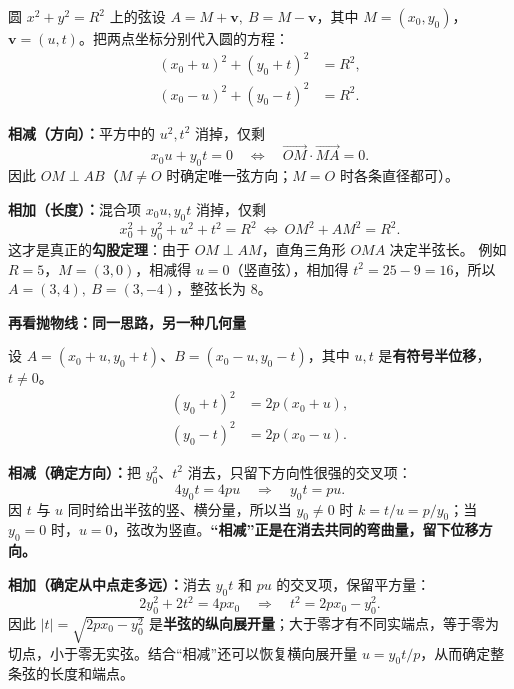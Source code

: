 \begin{explanationbox}
圆 $x^2+y^2=R^2$ 上的弦设 $A=M+\mathbf v,\ B=M-\mathbf v$，其中
$M=(x_0,y_0)$，$\mathbf v=(u,t)$。把两点坐标分别代入圆的方程：
\[
\begin{aligned}
 (x_0+u)^2+(y_0+t)^2&=R^2,\\
 (x_0-u)^2+(y_0-t)^2&=R^2.
\end{aligned}
\]
\par\noindent\textbf{相减（方向）：}平方中的 $u^2,t^2$ 消掉，仅剩
\[
\boxed{x_0u+y_0t=0}
\quad\Longleftrightarrow\quad
\overrightarrow{OM}\cdot\overrightarrow{MA}=0.
\]
因此 $OM\perp AB$（$M\ne O$ 时确定唯一弦方向；$M=O$ 时各条直径都可）。
\par\noindent\textbf{相加（长度）：}混合项 $x_0u,y_0t$ 消掉，仅剩
\[
\boxed{x_0^2+y_0^2+u^2+t^2=R^2}
\ \Longleftrightarrow\ \boxed{OM^2+AM^2=R^2}.
\]
这才是真正的\textbf{勾股定理}：由于 $OM\perp AM$，直角三角形 $OMA$ 决定半弦长。
例如 $R=5$，$M=(3,0)$，相减得 $u=0$（竖直弦），相加得 $t^2=25-9=16$，所以 $A=(3,4),\ B=(3,-4)$，整弦长为 $8$。
\par\medskip
\begin{minipage}{\linewidth}
\noindent
\textbf{\textcolor{CExplanation}{再看抛物线：同一思路，另一种几何量}}\par\nobreak\smallskip
\par
\begin{minipage}{\linewidth}
\begin{center}
\resizebox{0.82\linewidth}{!}{}
\end{center}
\end{minipage}\par
\end{minipage}
\par

\par

设 $A=(x_0+u,y_0+t)$、$B=(x_0-u,y_0-t)$，其中 $u,t$ 是\textbf{有符号半位移}，$t\ne0$。
\[
\begin{aligned}
 (y_0+t)^2&=2p(x_0+u),\\
 (y_0-t)^2&=2p(x_0-u).
\end{aligned}
\]
\par\noindent\textbf{相减（确定方向）：}把 $y_0^2$、$t^2$ 消去，只留下方向性很强的交叉项：
\[
4y_0t=4pu\quad\Longrightarrow\quad
\boxed{y_0t=pu}.
\]
因 $t$ 与 $u$ 同时给出半弦的竖、横分量，所以当 $y_0\ne0$ 时
$k=t/u=p/y_0$；当 $y_0=0$ 时，$u=0$，弦改为竖直。\textbf{“相减”正是在消去共同的弯曲量，留下位移方向。}

\par\noindent\textbf{相加（确定从中点走多远）：}消去 $y_0t$ 和 $pu$ 的交叉项，保留平方量：
\[
2y_0^2+2t^2=4px_0\quad\Longrightarrow\quad
\boxed{t^2=2px_0-y_0^2}.
\]
因此 $|t|=\sqrt{2px_0-y_0^2}$ 是\textbf{半弦的纵向展开量}；大于零才有不同实端点，等于零为切点，小于零无实弦。结合“相减”还可以恢复横向展开量
$u=y_0t/p$，从而确定整条弦的长度和端点。


\end{explanationbox}
